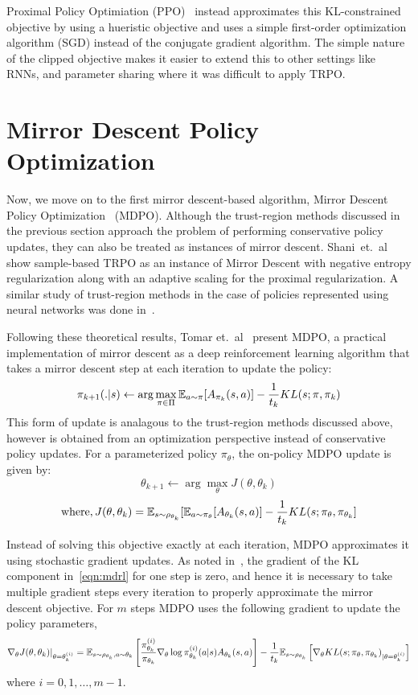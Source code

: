 Proximal Policy Optimiation (PPO)~\cite{schulmanProximal2017} instead approximates this
KL-constrained objective by using a hueristic objective and uses a simple first-order optimization
algorithm (SGD) instead of the conjugate gradient algorithm.
The simple nature of the clipped objective makes it easier to extend this to other settings like
RNNs, and parameter sharing where it was difficult to apply TRPO.

\section[MDPO]{Mirror Descent Policy Optimization}
Now, we move on to the first mirror descent-based algorithm, Mirror Descent Policy
Optimization~\cite{tomarMirror2022} (MDPO).
Although the trust-region methods discussed in the previous section approach the problem of
performing conservative policy updates, they can also be treated as instances of mirror descent.
Shani~et.~al~\cite{shaniAdaptive2020} show sample-based TRPO as an instance of Mirror Descent with
negative entropy regularization along with an adaptive scaling for the proximal regularization.
A similar study of trust-region methods in the case of policies represented using neural networks
was done in~\cite{liuNeural2019}.

Following these theoretical results, Tomar et.~al~\cite{tomarMirror2022} present MDPO, a practical
implementation of mirror descent as a deep reinforcement learning algorithm that takes a mirror
descent step at each iteration to update the policy:
\begin{equation}
	\label{eqn:mdrl} \pi_{k+1}(.
	|s) \leftarrow \arg
	\max_{\pi \in \Pi}
	\mathbb{E}_{a \sim \pi} [A_{\pi_k}(s,a)] -
	\frac{1}{t_k}
	KL(s; \pi, \pi_k)
\end{equation} This form of update is analagous to the trust-region methods
discussed above, however is obtained from an optimization perspective instead of conservative
policy updates.
For a parameterized policy $\pi_{\theta}$, the on-policy MDPO update is given by: $$ \theta_{k+1}
	\leftarrow \arg \max_{\theta} J(\theta, \theta_k)$$ $$ \text{where}, J(\theta, \theta_k) = \mathbb{E}_{s
		\sim \rho_{\theta_k}} [ \mathbb{E}_{a \sim \pi_\theta}[A_{\theta_k}(s,a)] - \frac{1}{t_k} KL(s; \pi_\theta,
		\pi_{\theta_k}]$$

Instead of solving this objective exactly at each iteration,
MDPO approximates it using stochastic gradient updates.
As noted in~\cite{tomarMirror2022}, the gradient of the KL component in~\ref{eqn:mdrl} for one step
is zero, and hence it is necessary to take multiple gradient steps every iteration to properly
approximate the mirror descent objective.
For $m$ steps MDPO uses the following gradient to update the policy parameters,
\begin{equation}
	\label{eqn:mdpograd} \nabla_{\theta} J(\theta, \theta_k)|_{\theta = \theta_k^{(i)}} = \mathbb{E}_{s \sim
		\rho_{\theta_k}, a \sim \theta_k} \left[ \frac{ \pi_{\theta_k}^{(i)}}{ \pi_{\theta_k}}
		\nabla_{\theta} \log \pi_{\theta_k}^{(i)} (a|s) A_{\theta_k}(s,a) \right] - \frac{1}{t_k} \mathbb{E}_{s
		\sim \rho_{\theta_k}} \left[\nabla_\theta KL(s; \pi_\theta, \pi_{\theta_k})_{|\theta=
				\theta_k^{(i)}} \right]
\end{equation} where $i=0,1,\ldots,m-1$.

